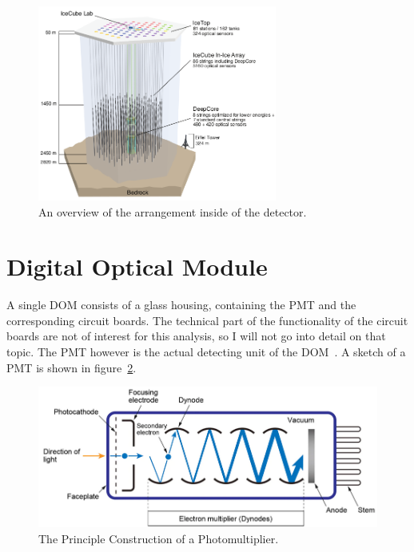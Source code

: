 \begin{figure}[htbp]
    \centering
    \includegraphics[width=0.7\textwidth]{content/pictures/icecube_sketch_01.png}
    \caption{An overview of the arrangement inside of the detector.\cite{Aartsen_2017}}\label{fig:icecube_sketch_01}
\end{figure}

\section{Digital Optical Module}\label{sec:dom}

A single DOM consists of a glass housing, containing the PMT and the corresponding circuit boards. The technical part of the functionality of 
the circuit boards are not of interest for this analysis, so I will not go into detail on that topic. The PMT however is the actual detecting unit of 
the DOM~. A sketch of a PMT is shown in figure~\ref{fig:pmt01}.

\begin{figure}[htbp]
    \centering
    \includegraphics[width=\textwidth]{content/pictures/pmt_sketch_01.png}
    \caption{The Principle Construction of a Photomultiplier\cite{photomultiplier_matsusada}.}\label{fig:pmt01}
\end{figure}

